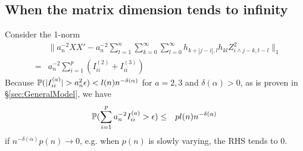 \documentclass{article}
\begin{document}
\subsection{When the matrix dimension tends to infinity}
Consider the 1-norm
\begin{eqnarray*}
  && \| a_n^{-2} XX' - a_n^{-2} \sum_{t=1}^n
     \sum_{k=0}^\infty \sum_{l=0}^\infty
     h_{k+|j-i|,l} h_{kl} Z_{i \wedge j -k, t-l}^2\|_1 \\
  &=& a_n^{-2} \sum_{i=1}^p (I^{(2)}_{ii} + I^{(3)}_{ii})
\end{eqnarray*}
Because $\mathbb{P}(|I^{(a)}_{ii}| > a_n^2 \epsilon) < l(n)
n^{-\delta(\alpha)}$ for $a = 2,3$ and $\delta(\alpha) > 0$, as is
proven in \S\ref{sec:GeneralModel}, we have
\begin{eqnarray*}
  \mathbb{P}(\sum_{i=1}^p a_n^{-2} I^{(a)}_{ii} > \epsilon) &\leq& p l(n)
  n^{-\delta(\alpha)}
\end{eqnarray*}
if $n^{-\delta(\alpha)} p(n) \to 0$, e.g. when $p(n)$ is slowly varying, the RHS
tends to 0.






\end{document}
